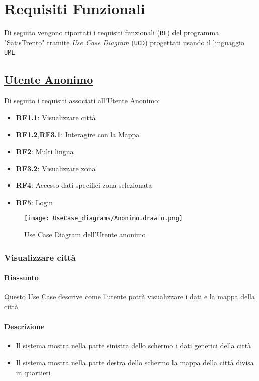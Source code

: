 \chapter{Requisiti Funzionali}
\label{ch:requisitiFunzionali}

Di seguito vengono riportati i requisiti funzionali (\texttt{RF}) del programma "SatisTrento" tramite \textit{Use Case Diagram} (\texttt{UCD}) progettati usando il linguaggio \texttt{UML}.

\section{\underline{Utente Anonimo}}
    Di seguito i requisiti associati all'Utente Anonimo:
    \begin{itemize}
        \item \textbf{RF1.1}: Visualizzare città
        \item \textbf{RF1.2},\textbf{RF3.1}: Interagire con la Mappa
        \item \textbf{RF2}: Multi lingua
        \item \textbf{RF3.2}: Visualizzare zona
        \item \textbf{RF4}: Accesso dati specifici zona selezionata
        \item \textbf{RF5}: Login
    \end{itemize}
    \begin{figure}[H]
        \centering
        \texttt{[image: UseCase\_diagrams/Anonimo.drawio.png]}
        \caption{Use Case Diagram dell'Utente anonimo}
    \end{figure}

    \subsection{Visualizzare città}
        \subsubsection{Riassunto}
            Questo Use Case descrive come l'utente potrà visualizzare i dati e la mappa della città
        \subsubsection{Descrizione}
            \begin{itemize}
                \item Il sistema mostra nella parte sinistra dello schermo i dati generici della città
                \item Il sistema mostra nella parte destra dello schermo la mappa della città divisa in quartieri
            \end{itemize}
    
